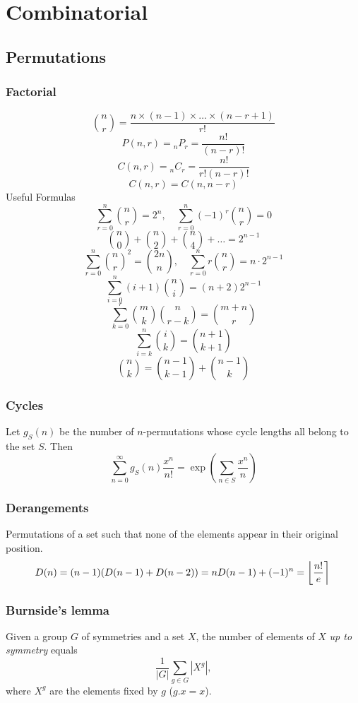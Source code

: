 \chapter{Combinatorial}

\section{Permutations}
	\subsection{Factorial}
		
		$$\binom{n}{r} = \frac{n \times (n-1) \times \dots \times (n-r+1)}{r!}$$
		$$P(n, r) = {}_nP_r = \frac{n!}{(n - r)!}$$
		$$C(n, r) = {}_nC_r = \frac{n!}{r!(n - r)!}$$
		$$C(n, r) = C(n, n - r)$$
		Useful Formulas
		$$\sum_{r=0}^{n} \binom{n}{r} = 2^n, \quad \sum_{r=0}^{n} (-1)^r \binom{n}{r} = 0$$
		$$\binom{n}{0}+\binom{n}{2}+\binom{n}{4}+\dots=2^{n-1}$$
		$$\sum_{r=0}^{n} \binom{n}{r}^2 = \binom{2n}{n}, \quad \sum_{r=0}^{n} r \binom{n}{r} = n \cdot 2^{n-1}$$
		$$\sum_{i=0}^{n} (i+1)\binom{n}{i} = (n+2)2^{n-1}$$
		$$\sum_{k=0}^{r} \binom{m}{k} \binom{n}{r-k} = \binom{m+n}{r}$$
		$$\sum_{i=k}^{n} \binom{i}{k} = \binom{n+1}{k+1}$$
		$$\binom{n}{k} = \binom{n-1}{k-1} + \binom{n-1}{k}$$

	\subsection{Cycles}
		Let $g_S(n)$ be the number of $n$-permutations whose cycle lengths all belong to the set $S$. Then
		$$\sum_{n=0} ^\infty g_S(n) \frac{x^n}{n!} = \exp\left(\sum_{n\in S} \frac{x^n} {n} \right)$$

	\subsection{Derangements}
		Permutations of a set such that none of the elements appear in their original position.
		\[ \mkern-2mu D(n) = (n-1)(D(n-1)+D(n-2)) = n D(n-1)+(-1)^n = \left\lfloor\frac{n!}{e}\right\rceil \]

	\subsection{Burnside's lemma}
		Given a group $G$ of symmetries and a set $X$, the number of elements of $X$ \emph{up to symmetry} equals
		 \[ {\frac {1}{|G|}}\sum _{{g\in G}}|X^{g}|, \]
		 where $X^{g}$ are the elements fixed by $g$ ($g.x = x$).

